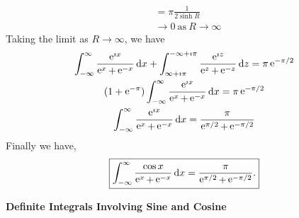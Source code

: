 {\begin{Solution}
\begin{align*}
    &= \pi \frac{1}{2 \sinh R} \\
    &\to 0\ \mathrm{as}\ R \to \infty
  \end{align*}
  Taking the limit as $R \to \infty$, we have
  \begin{gather*}
    \int_{-\infty}^\infty \frac{ \e^{\imath x} }{ \e^{x} + \e^{-x} } \,\dd x
    + \int_{\infty + \imath \pi}^{-\infty + \imath \pi} 
    \frac{ \e^{\imath z} }{ \e^{z} + \e^{-z} } \,\dd z
    = \pi \e^{-\pi / 2} \\
    (1 + \e^{- \pi}) \int_{-\infty}^\infty \frac{ \e^{\imath x} }{ \e^{x} + \e^{-x} } \,\dd x
    = \pi \e^{-\pi / 2} \\
    \int_{-\infty}^\infty \frac{ \e^{\imath x} }{ \e^{x} + \e^{-x} } \,\dd x
    = \frac{ \pi }{ \e^{\pi/2} + \e^{-\pi/2} }
  \end{gather*}
  Finally we have,
  \[
  \boxed{
    \int_{-\infty}^\infty \frac{ \cos x }{ \e^{x} + \e^{-x} } \,\dd x
    = \frac{ \pi }{ \e^{\pi/2} + \e^{-\pi/2} }.
    }
  \]
\end{Solution}








\begin{large}
  \noindent
  \textbf{Definite Integrals Involving Sine and Cosine}
\end{large}







}
